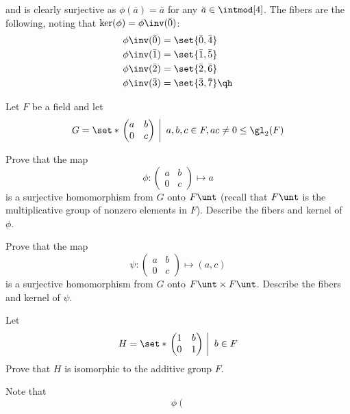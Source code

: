 \begin{problems}
\begin{sol}
        and is clearly surjective as $\phi(\bar  a) = \bar  a$ for any $\bar  a \in \intmod[4]$. The fibers are the following, noting that $\ker(\phi) = \phi\inv(\bar  0)$:
        \begin{align*}
            \phi\inv(\bar  0) & = \set{\bar  0, \bar  4} \\
            \phi\inv(\bar  1) & = \set{\bar  1, \bar  5} \\
            \phi\inv(\bar  2) & = \set{\bar  2, \bar  6} \\
            \phi\inv(\bar  3) & = \set{\bar  3, \bar  7} \qh
        \end{align*}
    \end{sol}
    \item Let $F$ be a field and let
    \[G = \set*{\left.
    \begin{pmatrix}
        a & b \\
        0 & c 
    \end{pmatrix}~\right|~a, b, c \in F, ac \neq 0} \leq \gl_2(F)\]
    \begin{problems}
        \item Prove that the map
        \[\phi : 
        \begin{pmatrix}
            a & b \\
            0 & c
        \end{pmatrix} \mapsto a\]
        is a surjective homomorphism from $G$ onto $F\unt$ (recall that $F\unt$ is the multiplicative group of nonzero elements in $F$). Describe the fibers and kernel of $\phi$.
        \item Prove that the map
        \[\psi : 
        \begin{pmatrix}
            a & b \\
            0 & c
        \end{pmatrix} \mapsto (a, c)\]
        is a surjective homomorphism from $G$ onto $F\unt \times F\unt$. Describe the fibers and kernel of $\psi$. 
        \item Let
        \[H = \set*{\left .
        \begin{pmatrix}
            1 & b \\
            0 & 1
        \end{pmatrix} ~\right\vert~b \in F}\]
        Prove that $H$ is isomorphic to the additive group $F$.
    \end{problems}
    \begin{solalph}
        \item Note that
        \[\phi\left(
\]
\end{solalph}
\end{problems}
